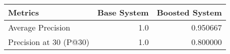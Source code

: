\begin{tabular}{lrr}
\toprule
               Metrics &  Base System &  Boosted System \\
\midrule
     Average Precision &          1.0 &        0.950667 \\
Precision at 30 (P@30) &          1.0 &        0.800000 \\
\bottomrule
\end{tabular}
